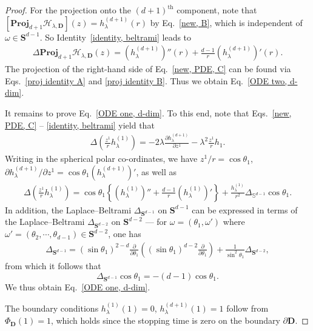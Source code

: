 \documentclass[10pt,a4paper]{amsart}
\newcommand{\proj}{\mathbf{Proj}}
\newcommand{\p}{\partial}
\begin{document}
\begin{proof}
For the projection onto the $(d+1)^{\text{th}}$ component, note that $\left[\proj_{d+1} \mathcal{H}_{\lambda,\mathbf{D}}\right](z)=h_\lambda^{(d+1)}(r)$  by Eq.~\eqref{new, B}, which is independent of $\omega \in \mathbf{S}^{d-1}$. So Identity~\eqref{identity, beltrami} leads to
\begin{align*}
    \Delta \proj_{d+1} \mathcal{H}_{\lambda,\mathbf{D}}(z) = \left(h_\lambda^{(d+1)}\right)''(r) + \frac{d-1}{r}\left(h_\lambda^{(d+1)}\right)'(r).
\end{align*}
The projection of the right-hand side of Eq.~\eqref{new, PDE, C} can be found via Eqs.~\eqref{proj identity A} and \eqref{proj identity B}. Thus we obtain Eq.~\eqref{ODE two, d-dim}. 


It remains to prove Eq.~\eqref{ODE one, d-dim}. To this end, note that Eqs.~\eqref{new, PDE, C} -- \eqref{identity, beltrami} yield that
\begin{align*}
    \Delta\left(\frac{z^1}{r} h_\lambda^{(1)}\right) = -2\lambda \frac{\p h_\lambda^{(d+1)}}{\p z^1} - \lambda^2\frac{z^1}{r}  h_1.
\end{align*}
Writing in the spherical polar co-ordinates, we have $z^1\slash r = \cos\theta_1$, $\p h_\lambda^{(d+1)}\slash{\p z^1} = \cos\theta_1 \left( h_\lambda^{(d+1)} \right)'$, as well as 
\begin{align*}
     \Delta\left(\frac{z^1}{r} h_\lambda^{(1)}\right) = \cos\theta_1\left\{ \left(h_\lambda^{(1)}\right)''+\frac{d-1}{r}\left(h_\lambda^{(1)}\right)'\right\}  + \frac{h_\lambda^{(1)}}{r^2} \Delta_{\mathbb{S}^{d-1}} \cos\theta_1.
\end{align*}
In addition, the Laplace--Beltrami $\Delta_{\mathbf{S}^{d-1}}$ on $\mathbf{S}^{d-1}$ can be expressed in terms of the Laplace--Beltrami $\Delta_{\mathbf{S}^{d-2}}$ on $\mathbf{S}^{d-2}$ --- for $\omega = (\theta_1, \omega')$ where $\omega'=(\theta_2,\cdots,\theta_{d-1}) \in \mathbf{S}^{d-2}$, one has
\begin{align*}
    \Delta_{\mathbf{S}^{d-1}} = \left(\sin\theta_1\right)^{2-d} \frac{\p}{\p\theta_1} \left( \left(\sin\theta_1\right)^{d-2}\frac{\p}{\p \theta_1} \right) + \frac{1}{\sin^2 \theta_1} \Delta_{\mathbf{S}^{d-2}},
\end{align*}
from which it follows that $$\Delta_{\mathbf{S}^{d-1}} \cos\theta_1 = -(d-1)\cos\theta_1.$$ We thus obtain Eq.~\eqref{ODE one, d-dim}.

The boundary conditions $h^{(1)}_\lambda (1) = 0$, $h^{(d+1)}_\lambda(1)=1$ follow from $\Phi_{\mathbf{D}}(1)=1$, which holds since the stopping time is zero on the boundary $\p\mathbf{D}$.   \end{proof}
\end{document}
